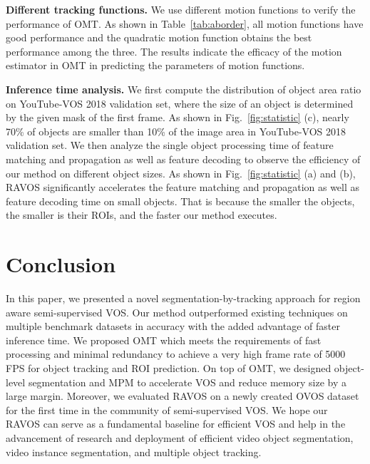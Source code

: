 \documentclass[journal]{IEEEtran}
\begin{document}
\textbf{Different tracking functions.} We use different motion functions to verify the performance of OMT. As shown in Table~\ref{tab:aborder}, all motion functions have good performance and the quadratic motion function obtains the best performance among the three. The results indicate the efficacy of the motion estimator in OMT in predicting the parameters of motion functions.



\textbf{Inference time analysis.}
We first compute the distribution of object area ratio on YouTube-VOS 2018 validation set, where the size of an object is determined by the given mask of the first frame. As shown in Fig.~\ref{fig:statistic} (c), nearly 70\% of objects are smaller than 10\% of the image area in YouTube-VOS 2018 validation set. We then analyze the single object processing time of feature matching and propagation as well as feature decoding to observe the efficiency of our method on different object sizes. As shown in Fig.~\ref{fig:statistic}  (a) and (b), RAVOS significantly accelerates the feature matching and propagation as well as feature decoding time on small objects. That is because the smaller the objects, the smaller is their ROIs, and the faster our method executes.



\section{Conclusion}
In this paper, we presented a novel segmentation-by-tracking approach for region aware semi-supervised VOS. Our method outperformed existing techniques on multiple benchmark datasets in accuracy with the added advantage of faster inference time. We proposed OMT which meets the requirements of fast processing and minimal redundancy to achieve a very high frame rate of 5000 FPS for object tracking and ROI prediction. On top of OMT, we designed object-level segmentation and MPM to accelerate VOS and reduce memory size by a large margin. Moreover, we evaluated RAVOS on a newly created OVOS dataset for the first time in the community of semi-supervised VOS. We hope our RAVOS can serve as a fundamental baseline for efficient VOS and help in the advancement of research and deployment of efficient video object segmentation, video instance segmentation, and multiple object tracking.  




















\ifCLASSOPTIONcaptionsoff
  \newpage
\fi













\vfill
\end{document}

